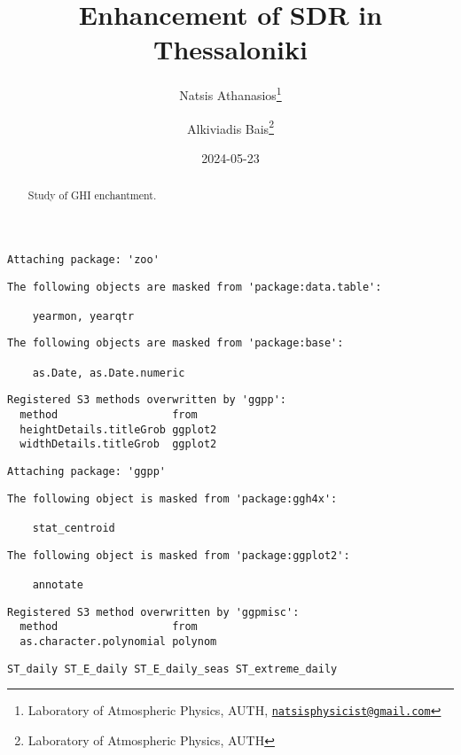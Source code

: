 \documentclass[
  10pt,
  a4paper,oneside]{article}
\title{Enhancement of SDR in Thessaloniki}
\author{Natsis Athanasios\footnote{Laboratory of Atmospheric Physics, AUTH, \href{mailto:natsisphysicist@gmail.com}{\nolinkurl{natsisphysicist@gmail.com}}} \and Alkiviadis Bais\footnote{Laboratory of Atmospheric Physics, AUTH}}
\date{2024-05-23}
\begin{document}
\maketitle
\begin{abstract}
Study of GHI enchantment.
\end{abstract}

{
\hypersetup{linkcolor=}
\setcounter{tocdepth}{4}
\tableofcontents
}
\begin{verbatim}
Attaching package: 'zoo'
\end{verbatim}

\begin{verbatim}
The following objects are masked from 'package:data.table':

    yearmon, yearqtr
\end{verbatim}

\begin{verbatim}
The following objects are masked from 'package:base':

    as.Date, as.Date.numeric
\end{verbatim}

\begin{verbatim}
Registered S3 methods overwritten by 'ggpp':
  method                  from   
  heightDetails.titleGrob ggplot2
  widthDetails.titleGrob  ggplot2
\end{verbatim}

\begin{verbatim}
Attaching package: 'ggpp'
\end{verbatim}

\begin{verbatim}
The following object is masked from 'package:ggh4x':

    stat_centroid
\end{verbatim}

\begin{verbatim}
The following object is masked from 'package:ggplot2':

    annotate
\end{verbatim}

\begin{verbatim}
Registered S3 method overwritten by 'ggpmisc':
  method                  from   
  as.character.polynomial polynom
\end{verbatim}

\begin{verbatim}
ST_daily ST_E_daily ST_E_daily_seas ST_extreme_daily
\end{verbatim}
\end{document}
